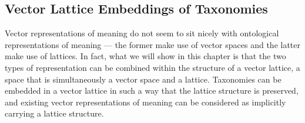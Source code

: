 


\subsection{Vector Lattice Embeddings of Taxonomies}


Vector representations of meaning do not seem to sit nicely with ontological representations of meaning --- the former make use of vector spaces and the latter make use of lattices. In fact, what we will show in this chapter is that the two types of representation can be combined within the structure of a vector lattice, a space that is simultaneously a vector space and a lattice. Taxonomies can be embedded in a vector lattice in such a way that the lattice structure is preserved, and existing vector representations of meaning can be considered as implicitly carrying a lattice structure.

